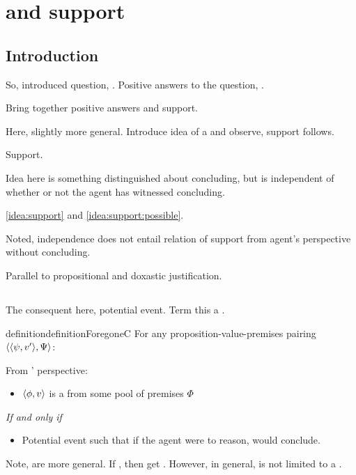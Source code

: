 \chapter{ and support}
\label{cha:fcs}

\section{Introduction}
\label{cha:fcs:sec:introduction}

\begin{note}
  So, introduced question, \qzS{}.
  Positive answers to the question, .

  Bring together positive answers and support.

  Here, slightly more general.
  Introduce idea of a \fc{} and observe, support follows.
\end{note}

\begin{note}
  Support.

  Idea here is something distinguished about concluding, but is independent of whether or not the agent has witnessed concluding.

  \autoref{idea:support} and \autoref{idea:support:possible}.

  Noted, independence does not entail relation of support from agent's perspective without concluding.

  Parallel to propositional and doxastic justification.
\end{note}

\section{}
\label{sec:fc3-2}

\begin{note}
  The consequent here, potential event.
  Term this a \fc{}.

  \begin{restatable}{definition}{definitionForegoneC}
    For any proposition-value-premises pairing \(\langle \langle \psi, v' \rangle, \Psi \rangle\):

    From \vAgent{}' perspective:
    \begin{itemize}
    \item
      \(\langle \phi, v \rangle\) is a \emph{} from some pool of premises \(\Phi\)
    \end{itemize}
    \emph{If and only if}
    \begin{itemize}
    \item
      Potential event such that if the agent were to reason, would conclude.
    \end{itemize}
  \end{restatable}

  Note, \fc{} are more general.
  If \requ{}, then get \fc{}.
  However, \fc{} in general, is not limited to a \requ{}.
\end{note}

